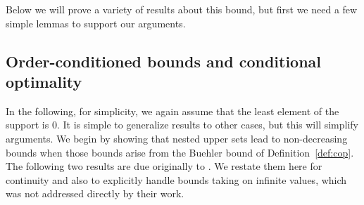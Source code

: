 \documentclass{article}
\newtheorem{lemma}[theorem]{Lemma}
\theoremstyle{definition}
\theoremstyle{remark}
\def\x{\mathbf{x}}
\begin{document}
Below we will prove a variety of results about this bound, but first we need a few simple lemmas to support our arguments.




\subsection{Order-conditioned bounds and conditional optimality}

In the following, for simplicity, we again assume that the least element of the support is $0$. It is simple to generalize results to other cases, but this will simplify arguments. We begin by showing that nested upper sets lead to non-decreasing bounds when those bounds arise from the Buehler bound of Definition~\ref{def:cop}. The following two results are due originally to \cite{GuerreroDavid1985Buehler}. We restate them here for continuity and also to explicitly handle bounds taking on infinite values, which was not addressed directly by their work. 
\end{document}
